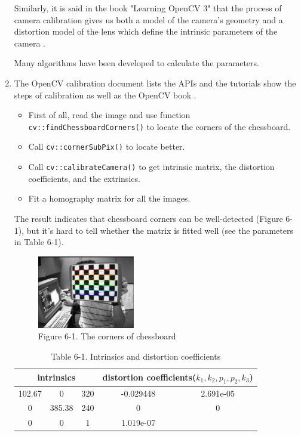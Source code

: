 \documentclass{article}
\begin{document}
\begin{enumerate}
Similarly, it is said in the book "Learning OpenCV 3" that the process of camera calibration gives us both a model of the camera’s geometry and a distortion model of the lens which define the intrinsic parameters of the camera \cite{ref9}.

Many algorithms have been developed to calculate the parameters.

\item The OpenCV calibration document lists the APIs and the tutorials show the steps of calibration as well as the OpenCV book \cite{ref9}\cite{ref10}.
\begin{itemize}
  \item First of all, read the image and use function \verb|cv::findChessboardCorners()| to locate the corners of the chessboard.
  \item Call \verb|cv::cornerSubPix()| to locate better.
  \item Call \verb|cv::calibrateCamera()| to get intrinsic matrix, the distortion coefficients, and the extrinsics.
	\item Fit a homography matrix for all the images.
\end{itemize}

The result indicates that chessboard corners can be well-detected (Figure 6-1), but it's hard to tell whether the matrix is fitted well (see the parameters in Table 6-1).
\begin{figure}[h]
	\centering
	\includegraphics[width=0.4\textwidth]{6-1}
	\caption*{Figure 6-1. The corners of chessboard}
\end{figure}

\begin{table}[h]
	\caption*{Table 6-1. Intrinsics and distortion coefficients}
	\centering
	\begin{tabular}{ccc|cc}
		\toprule[2pt]
		\multicolumn{3}{c|}{intrinsics} & \multicolumn{2}{c}{distortion coefficients($k_1, k_2, p_1, p_2, k_3$)} \\ \hline
		102.67     & 0         & 320    & -0.029448            & 2.691e-05            \\
		0          & 385.38    & 240    & 0                    & 0                    \\
		0          & 0         & 1      & 1.019e-07            &                      \\
		\bottomrule[2pt]
	\end{tabular}
\end{table}


\end{enumerate}
\end{document}

